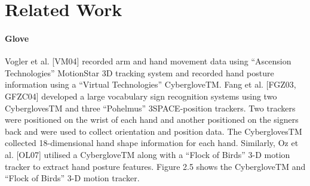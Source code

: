 \section{Related Work}

\paragraph*{Glove} Vogler et al. [VM04] recorded arm and hand movement data using “Ascension Technologies” MotionStar 3D tracking system and recorded hand posture information using a “Virtual Technologies” CybergloveTM. Fang et al. [FGZ03, GFZC04] developed a large vocabulary sign recognition systems using two CyberglovesTM and three “Pohelmus” 3SPACE-position trackers. Two trackers were positioned on the wrist of each hand and another positioned on the signers back and were used to collect orientation and position data. The CyberglovesTM collected 18-dimensional hand shape information for each hand. Similarly, Oz et al. [OL07] utilised a CybergloveTM along with a “Flock of Birds” 3-D motion tracker to extract hand posture features. Figure 2.5 shows the CybergloveTM and “Flock of Birds” 3-D motion tracker.
